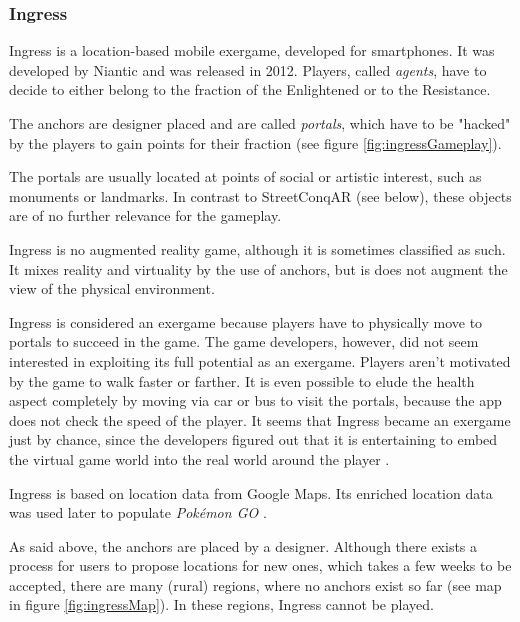 \subsubsection{Ingress}
Ingress is a location-based mobile exergame, developed for smartphones. It was developed by Niantic and was released in 2012. Players, called \emph{agents}, have to decide to either belong to the fraction of the Enlightened or to the Resistance.

The anchors are designer placed and are called \emph{portals}, which have to be "hacked" by the players to gain points for their fraction (see figure \ref{fig:ingressGameplay}).

The portals are usually located at points of social or artistic interest, such as monuments or landmarks. In contrast to StreetConqAR (see below), these objects are of no further relevance for the gameplay.

Ingress is no augmented reality game, although it is sometimes classified as such. It mixes reality and virtuality by the use of anchors, but is does not augment the view of the physical environment.

Ingress is considered an exergame because players have to physically move to portals to succeed in the game. The game developers, however, did not seem interested in exploiting its full potential as an exergame. Players aren't motivated by the game to walk faster or farther. It is even possible to elude the health aspect completely by moving via car or bus to visit the portals, because the app does not check the speed of the player. It seems that Ingress became an exergame just by chance, since the developers figured out that it is entertaining to embed the virtual game world into the real world around the player \citep{knoll2014urban}.

Ingress is based on location data from Google Maps. Its enriched location data was used later to populate \emph{Pok\'{e}mon GO} \citep{Ingress}.

As said above, the anchors are placed by a designer. Although there exists a process for users to propose locations for new ones, which takes a few weeks to be accepted, there are many (rural) regions, where no anchors exist so far (see map in figure \ref{fig:ingressMap}). In these regions, Ingress cannot be played.

